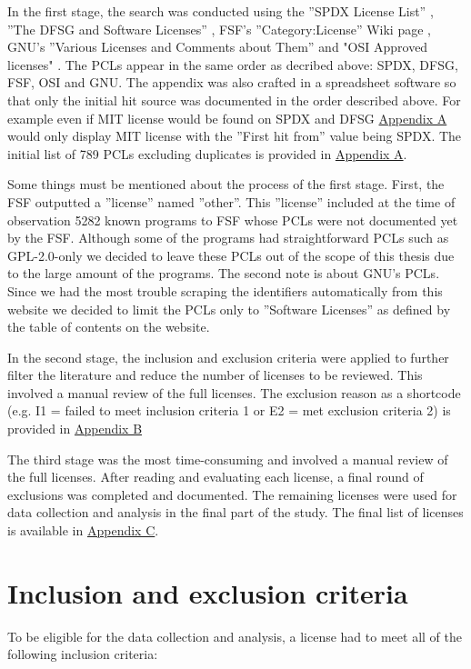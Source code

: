 In the first stage, the search was conducted using the ''SPDX License List'' \citep{spdx:licenses}, ''The DFSG and Software Licenses'' \citep{debian:dfsg}, FSF's ''Category:License'' Wiki page \citep{fsf:licenselist}, GNU's ''Various Licenses and Comments about Them'' \citep{gnu:licenselist} and "OSI Approved licenses" \citep{osi:licenselist}. The PCLs appear in the same order as decribed above: SPDX, DFSG, FSF, OSI and GNU. The appendix was also crafted in a spreadsheet software so that only the initial hit source was documented in the order described above. For example even if MIT license would be found on SPDX and DFSG \hyperref[appendix:a]{Appendix A} would only display MIT license with the ''First hit from'' value being SPDX. The initial list of 789 PCLs excluding duplicates is provided in \hyperref[appendix:a]{Appendix A}. 

Some things must be mentioned about the process of the first stage. First, the FSF outputted a ''license'' named ''other''. This ''license'' included at the time of observation 5282 known programs to FSF whose PCLs were not documented yet by the FSF. Although some of the programs had straightforward PCLs such as GPL-2.0-only we decided to leave these PCLs out of the scope of this thesis due to the large amount of the programs. The second note is about GNU's PCLs. Since we had the most trouble scraping the identifiers automatically from this website we decided to limit the PCLs only to ''Software Licenses'' as defined by the table of contents on the website.

In the second stage, the inclusion and exclusion criteria were applied to further filter the literature and reduce the number of licenses to be reviewed. This involved a manual review of the full licenses. The exclusion reason as a shortcode (e.g. I1 = failed to meet inclusion criteria 1 or E2 = met exclusion criteria 2) is provided in \hyperref[appendix:b]{Appendix B}

The third stage was the most time-consuming and involved a manual review of the full licenses. After reading and evaluating each license, a final round of exclusions was completed and documented. The remaining licenses were used for data collection and analysis in the final part of the study. The final list of licenses is available in \hyperref[appendix:c]{Appendix C}.

\section{Inclusion and exclusion criteria}
To be eligible for the data collection and analysis, a license had to meet all of the following inclusion criteria:

